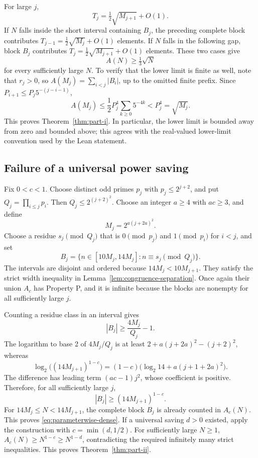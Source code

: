 For large \(j\),
\[
 T_j=\tfrac12\sqrt{M_{j+1}}+O(1).
\]
If \(N\) falls inside the short interval containing \(B_j\), the
preceding complete block contributes
\(T_{j-1}=\tfrac12\sqrt{M_j}+O(1)\) elements. If \(N\) falls in the
following gap, block \(B_j\) contributes
\(T_j=\tfrac12\sqrt{M_{j+1}}+O(1)\) elements. These two cases give
\[
 A(N)\ge\tfrac13\sqrt N
\]
for every sufficiently large \(N\).
To verify that the lower limit is finite as well, note that \(r_j>0\),
so \(A(M_j)=\sum_{i<j}|B_i|\), up to the omitted finite prefix. Since
\(P_{i+1}\le P_j5^{-(j-i-1)}\),
\[
 A(M_j)\le\frac12 P_j^4\sum_{k\ge0}5^{-4k}<P_j^4=\sqrt{M_j}.
\]
This proves Theorem~\ref{thm:part-i}. In particular, the lower limit is
bounded away from zero and bounded above; this agrees with the real-valued
lower-limit convention used by the Lean statement.

\subsection{Failure of a universal power saving}

Fix \(0<c<1\). Choose distinct odd primes \(p_j\) with
\(p_j\le2^{j+2}\), and put \(Q_j=\prod_{i\le j}p_i\). Then
\(Q_j\le2^{(j+2)^2}\). Choose an integer \(a\ge4\) with \(ac\ge3\),
and define
\[
 M_j=2^{a(j+2a)^2}.
\]
Choose a residue \(s_j\pmod{Q_j}\) that is \(0\pmod{p_j}\) and
\(1\pmod{p_i}\) for \(i<j\), and set
\[
 B_j=\{n\in[10M_j,14M_j]:n\equiv s_j\pmod{Q_j}\}.
\]
The intervals are disjoint and ordered because
\(14M_j<10M_{j+1}\). They satisfy the strict width inequality in
Lemma~\ref{lem:congruence-separation}. Once again their union \(A_c\)
has Property P, and it is infinite because the blocks are nonempty for
all sufficiently large \(j\).

Counting a residue class in an interval gives
\[
 |B_j|\ge\frac{4M_j}{Q_j}-1.
\]
The logarithm to base 2 of \(4M_j/Q_j\) is at least
\(2+a(j+2a)^2-(j+2)^2\), whereas
\[
 \log_2\bigl((14M_{j+1})^{1-c}\bigr)
 =(1-c)\bigl(\log_2 14+a(j+1+2a)^2\bigr).
\]
The difference has leading term \((ac-1)j^2\), whose coefficient is
positive. Therefore, for all sufficiently large \(j\),
\[
 |B_j|\ge(14M_{j+1})^{1-c}.
\]
For \(14M_j\le N<14M_{j+1}\), the complete block \(B_j\) is already
counted in \(A_c(N)\). This proves \eqref{eq:parameterwise-dense}.
If a universal saving \(d>0\) existed, apply the construction with
\(c=\min(d,1/2)\). For sufficiently large \(N\ge1\),
\(A_c(N)\ge N^{1-c}\ge N^{1-d}\), contradicting the required
infinitely many strict inequalities. This proves
Theorem~\ref{thm:part-ii}.

